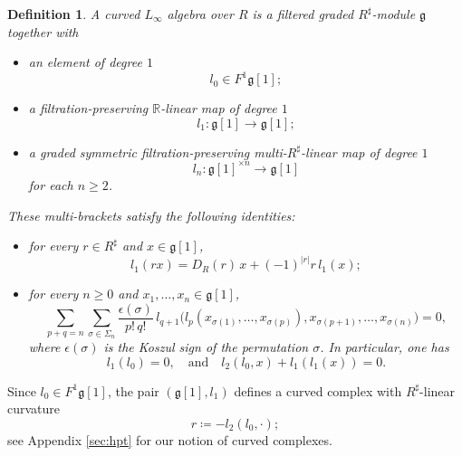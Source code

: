 \documentclass[12pt]{amsart}
\newtheorem{defn}{Definition}[section]
\numberwithin{equation}{section}
\theoremstyle{plain}
\newcommand{\fg}{\mathfrak{g}}
\newcommand{\R}{\mathbb{R}}
\newcommand{\uR}{{R^\sharp}}
\begin{document}
	\begin{defn}
		A \emph{curved $L_\infty$ algebra} over $R$ is a filtered graded $\uR$-module $\fg$ together with
		\begin{itemize}
			\item an element of degree $1$
			\[
			l_0 \in F^1 \fg[1];
			\]
			\item a filtration-preserving $\R$-linear map of degree $1$
			\[
			l_1\colon \fg[1] \rightarrow \fg[1];
			\]
			\item a graded symmetric filtration-preserving multi-$\uR$-linear map of degree $1$
			\[
			l_n\colon \fg[1]^{\times n} \longrightarrow \fg[1]
			\]
			for each $n \ge 2$.
		\end{itemize}
		These multi-brackets satisfy the following identities:
		\begin{itemize}
			\item for every $r \in R^\sharp$ and $x \in \fg[1]$,
			\[
			l_1(r x)
			=
			D_R(r)\, x
			+
			(-1)^{|r|} r\, l_1(x);
			\]
			\item for every $n \ge 0$ and  $x_1,\dots,x_n \in \fg[1]$,
			\[
			\sum_{p+q=n}
			\sum_{\sigma \in \Sigma_n}
			\frac{\epsilon(\sigma)}{p!\, q!}
			\,
			l_{q+1}\big(
			l_p(x_{\sigma(1)},\dots,x_{\sigma(p)}),
			x_{\sigma(p+1)},\dots,x_{\sigma(n)}
			\big)
			=
			0,
			\]
			where $\epsilon(\sigma)$ is the Koszul sign of the permutation $\sigma$. In particular, one has 
			\[
			l_1(l_0) = 0, \quad \text{and} \quad l_2(l_0, x) + l_1(l_1(x))=0.
			\]
		\end{itemize}
	\end{defn}	
	
	Since $l_0 \in F^1\fg[1]$, the pair $(\fg[1], l_1)$ defines a curved complex with $\uR$-linear curvature 
	\[
	r\coloneqq-l_2(l_0, \cdot);
	\]
	see Appendix \ref{sec:hpt} for our notion of curved complexes.
	
\end{document}
